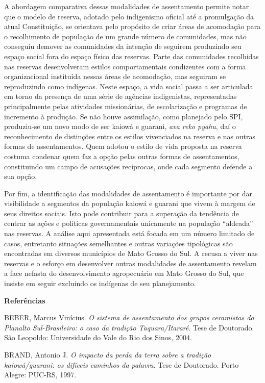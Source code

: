 A abordagem comparativa dessas modalidades de assentamento permite notar
que o modelo de reserva, adotado pelo indigenismo oficial até a
promulgação da atual Constituição, se orientava pelo propósito de criar
áreas de acomodação para o recolhimento de população de um grande número
de comunidades, mas não conseguiu demover as comunidades da intenção de
seguirem produzindo seu espaço social fora do espaço físico das
reservas. Parte das comunidades recolhidas nas reservas desenvolveram
estilos comportamentais condizentes com a forma organizacional
instituída nessas áreas de acomodação, mas seguiram se reproduzindo como
indígenas. Neste espaço, a vida social passa a ser articulada em torno
da presença de uma série de agências indigenistas, representadas
principalmente pelas atividades missionárias, de escolarização e
programas de incremento à produção. Se não houve assimilação, como
planejado pelo SPI, produziu-se um novo modo de ser kaiowá e guarani,
\emph{ava reko pyahu}, daí o reconhecimento de distinções entre os
estilos vivenciados na reserva e nas outras formas de assentamentos.
Quem adotou o estilo de vida proposta na reserva costuma condenar quem
faz a opção pelas outras formas de assentamentos, constituindo um campo
de acusações recíprocas, onde cada segmento defende a sua opção.

Por fim, a identificação das modalidades de assentamento é importante
por dar visibilidade a segmentos da população kaiowá e guarani que vivem
à margem de seus direitos sociais. Isto pode contribuir para a superação
da tendência de centrar as ações e políticas governamentais unicamente
na população ``aldeada'' nas reservas. A análise aqui apresentada está
focada em um número limitado de casos, entretanto situações semelhantes
e outras variações tipológicas são encontradas em diversos municípios de
Mato Grosso do Sul. A recusa a viver nas reservas e o esforço em
desenvolver outras modalidades de assentamento revelam a face nefasta do
desenvolvimento agropecuário em Mato Grosso do Sul, que insiste em
seguir excluindo os indígenas de seu planejamento.

\textbf{Referências}

BEBER, Marcus Vinícius. \emph{O sistema de assentamento dos grupos
ceramistas do Planalto Sul-Brasileiro: o caso da tradição
Taquara/Itararé}. Tese de Doutorado. São Leopoldo: Universidade do Vale
do Rio dos Sinos, 2004.

BRAND, Antonio J. \emph{O impacto da perda da terra sobre a tradição
kaiowá/guarani: os difíceis caminhos da palavra}. Tese de Doutorado.
Porto Alegre: PUC-RS, 1997.

